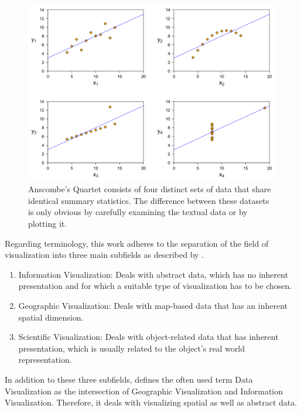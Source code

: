 \begin{figure}[tp]
    \centering
    \includegraphics[keepaspectratio,width=\linewidth,height=\fullh / 3]
    {images/anscombes-quartet.png}

    \caption[Anscombe's Quartet]{
        Anscombe's Quartet consists of four distinct sets of data that share identical summary statistics. The difference between these datasets is only obvious by carefully examining the textual data or by plotting it. 
    }
    \label{fig:AnscombesQuartet}
\end{figure}

Regarding terminology, this work adheres to the separation of the field of visualization into three main subfields as described by \cite{IVISCourseNotes}.

\begin{enumerate}
    \item Information Visualization: Deals with abstract data, which has no inherent presentation and for which a suitable type of visualization has to be chosen.
    \item Geographic Visualization: Deals with map-based data that has an inherent spatial dimension. 
    \item Scientific Visualization: Deals with object-related data that has inherent presentation, which is usually related to the object's real world representation.
\end{enumerate}

In addition to these three subfields, \cite{IVISCourseNotes} defines the often used term Data Visualization as the intersection of Geographic Visualization and Information Visualization. Therefore, it deals with visualizing spatial as well as abstract data.

